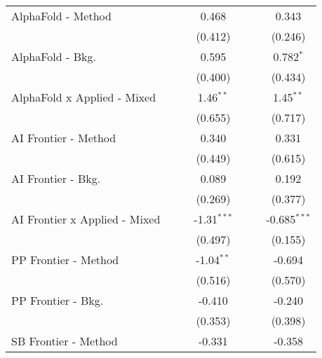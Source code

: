 \begin{tabular}{lcccccc}
   AlphaFold - Method             &             &              & 0.468         &              &         & 0.343\\   
                                  &             &              & (0.412)       &              &         & (0.246)\\   
   AlphaFold - Bkg.               &             &              & 0.595         &              &         & 0.782$^{*}$\\   
                                  &             &              & (0.400)       &              &         & (0.434)\\   
   AlphaFold x Applied - Mixed    &             &              & 1.46$^{**}$   &              &         & 1.45$^{**}$\\   
                                  &             &              & (0.655)       &              &         & (0.717)\\   
   AI Frontier - Method           &             &              & 0.340         &              &         & 0.331\\   
                                  &             &              & (0.449)       &              &         & (0.615)\\   
   AI Frontier - Bkg.             &             &              & 0.089         &              &         & 0.192\\   
                                  &             &              & (0.269)       &              &         & (0.377)\\   
   AI Frontier x Applied - Mixed  &             &              & -1.31$^{***}$ &              &         & -0.685$^{***}$\\   
                                  &             &              & (0.497)       &              &         & (0.155)\\   
   PP Frontier - Method           &             &              & -1.04$^{**}$  &              &         & -0.694\\   
                                  &             &              & (0.516)       &              &         & (0.570)\\   
   PP Frontier - Bkg.             &             &              & -0.410        &              &         & -0.240\\   
                                  &             &              & (0.353)       &              &         & (0.398)\\   
   SB Frontier - Method           &             &              & -0.331        &              &         & -0.358\\   

\end{tabular}
